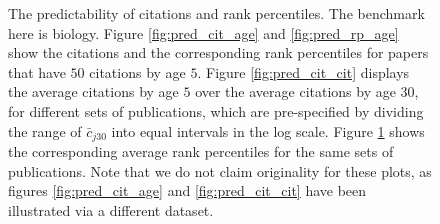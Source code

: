 \begin{figure}[ht!]
\begin{subfigure}[b]{0.48\textwidth}
         \caption{}
         \label{fig:pred_rp_rp}
     \end{subfigure}
        \caption{The predictability of citations and rank percentiles. The benchmark here is biology. Figure \ref{fig:pred_cit_age} and \ref{fig:pred_rp_age} show the citations and the corresponding rank percentiles for papers that have $50$ citations by age $5$. Figure \ref{fig:pred_cit_cit} displays the average citations by age $5$ over the average citations by age $30$, for different sets of publications, which are pre-specified by dividing the range of $\bar{c}_{j 30}$ into equal intervals in the log scale. Figure \ref{fig:pred_rp_rp} shows the corresponding average rank percentiles for the same sets of publications. Note that we do not claim originality for these plots, as figures \ref{fig:pred_cit_age} and \ref{fig:pred_cit_cit} have been illustrated via a different dataset\supercite{Wang2013}.}
        \label{fig:pub_cit_rp_pred}
\end{figure}


